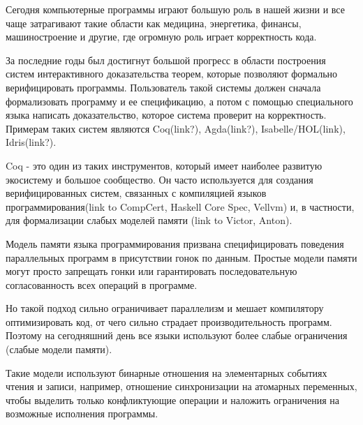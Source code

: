 \documentclass[times
              ]{itmo-student-thesis}
\begin{document}

\tableofcontents

\startprefacepage



Сегодня компьютерные программы играют большую роль в нашей жизни и все чаще затрагивают такие области как медицина, энергетика, финансы, машиностроение и другие, где огромную роль играет корректность кода.

За последние годы был достигнут большой прогресс в области построения систем интерактивного доказательства теорем, которые позволяют формально верифицировать программы.
Пользователь такой системы должен сначала формализовать программу и ее спецификацию, а потом с помощью специального языка написать доказательство, которое система проверит на корректность.
Примерам таких систем являются Coq(link?), Agda(link?), Isabelle/HOL(link), Idris(link?).

Coq - это один из таких инструментов, который имеет наиболее развитую экосистему и большое сообщество.
Он часто используется для создания верифицированных систем, связанных с компиляцией языков программирования(link to CompCert, Haskell Core Spec, Vellvm) и, в частности, для формализации слабых моделей памяти (link to Victor, Anton).

Модель памяти языка программирования призвана специфицировать поведения параллельных программ в присутствии гонок по данным.
Простые модели памяти могут просто запрещать гонки или гарантировать последовательную согласованность всех операций в программе.

Но такой подход сильно ограничивает параллелизм и мешает компилятору оптимизировать код, от чего сильно страдает производительность программ.
Поэтому на сегодняшний день все языки используют более слабые ограничения (слабые модели памяти).

Такие модели используют бинарные отношения на элементарных событиях чтения и записи, например, отношение синхронизации на атомарных переменных, чтобы выделить только конфликтующие операции и наложить ограничения на возможные исполнения программы.
\end{document}
